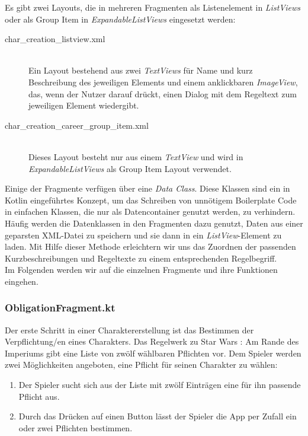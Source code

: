 Es gibt zwei Layouts, die in mehreren Fragmenten als Listenelement in \textit{ListViews} oder als Group Item in \textit{ExpandableListViews} eingesetzt werden:
\begin{description}
\item[char\_creation\_listview.xml]\mbox{}\\
Ein Layout bestehend aus zwei \textit{TextViews} für Name und kurz Beschreibung des jeweiligen Elements und einem anklickbaren \textit{ImageView}, das, wenn der Nutzer darauf drückt, einen Dialog mit dem Regeltext zum jeweiligen Element wiedergibt.
\item[char\_creation\_career\_group\_item.xml]\mbox{}\\
Dieses Layout besteht nur aus einem \textit{TextView} und wird in \textit{ExpandableListViews} als Group Item Layout verwendet.
\end{description}

Einige der Fragmente verfügen über eine \textit{Data Class}. Diese Klassen sind ein in Kotlin eingeführtes Konzept, um das Schreiben von unnötigem \grqq Boilerplate Code\grqq{} in einfachen Klassen, die nur als Datencontainer genutzt werden, zu verhindern\cite{dataclasses}. Häufig werden die Datenklassen in den Fragmenten dazu genutzt, Daten aus einer geparsten XML-Datei zu speichern und sie dann in ein \textit{ListView}-Element zu laden. Mit Hilfe dieser Methode erleichtern wir uns das Zuordnen der passenden Kurzbeschreibungen und Regeltexte zu einem entsprechenden Regelbegriff.\\

Im Folgenden werden wir auf die einzelnen Fragmente und ihre Funktionen eingehen.

\subsubsection{ObligationFragment.kt}
Der erste Schritt in einer Charaktererstellung ist das Bestimmen der Verpflichtung/en eines Charakters. Das Regelwerk zu \glqq Star Wars : Am Rande des Imperiums\grqq{}\cite[39]{rulebook} gibt eine Liste von zwölf wählbaren Pflichten vor. Dem Spieler werden zwei Möglichkeiten angeboten, eine Pflicht für seinen Charakter zu wählen:
\begin{enumerate}
\item Der Spieler sucht sich aus der Liste mit zwölf Einträgen eine für ihn passende Pflicht aus.
\item Durch das Drücken auf einen Button lässt der Spieler die App per Zufall ein oder zwei Pflichten bestimmen.
\end{enumerate}


